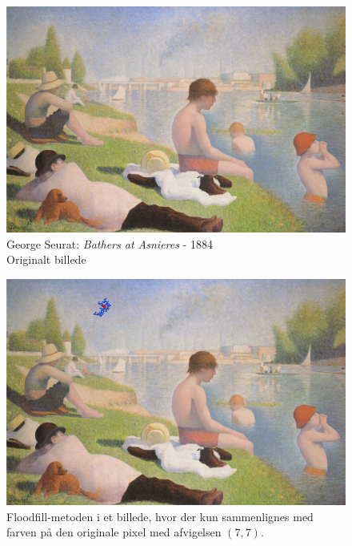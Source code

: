 {%
\begin{figure}[!h]
    \begin{center}
        \includegraphics[scale=8]{afsnit/vores_implementation/billeder/flood_fill/seurat_bathers}
    \end{center}
    \caption[George Seurat: \emph{Bathers at Asnieres} -- 1884]{George
    Seurat: \emph{Bathers at Asnieres} - 1884\\Originalt billede}
    \label{bathers}
\end{figure}

\begin{figure}[!h]
    \begin{center}
        \includegraphics[scale=0.49]{afsnit/vores_implementation/billeder/flood_fill/dot_ff_fixed_7_7}
    \end{center}
    \caption[]{Floodfill-metoden i et billede, hvor der kun sammenlignes
    med farven på den originale pixel med afvigelsen $(7,7)$.}
    \label{dot_ff_fixed_7_7}
\end{figure}

}
